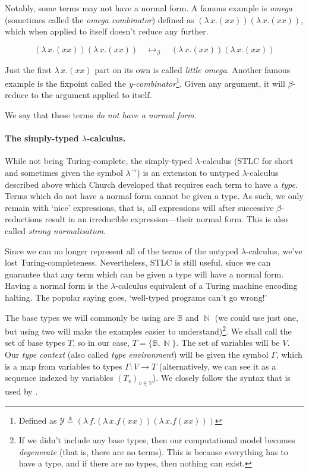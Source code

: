 \documentclass[logo,bsc,singlespacing,parskip,online]{infthesis}
\DeclareMathOperator{\nat}{\mathbb{N}}
\begin{document}
Notably, some terms may not have a normal form. A famous example is \textit{omega} (sometimes called the \textit{omega combinator}) defined as $(\lambda \, x. (x x)) (\lambda \, x. (x x))$, which when applied to itself doesn't reduce any further.

\begin{equation*}
  (\lambda \, x. (x x)) (\lambda \, x. (x x)) \quad \mapsto_{\beta} \quad (\lambda \, x. (x x)) (\lambda \, x. (x x))
\end{equation*}

Just the first $\lambda \, x. (x x)$ part on its own is called \textit{little omega}. Another famous example is the fixpoint called the \textit{y-combinator}\footnote{Defined as $\mathcal{Y} \triangleq (\lambda \, f. (\lambda \, x. f (x x )) (\lambda \, x. f (xx)))$}. Given any argument, it will $\beta$-reduce to the argument applied to itself.

We say that these terms \textit{do not have a normal form}.

\paragraph*{The simply-typed $\lambda$-calculus.} While not being Turing-complete, the simply-typed $\lambda$-calculus (STLC for short and sometimes given the symbol $\lambda^{\rightarrow}$) is an extension to untyped $\lambda$-calculus described above which Church developed that requires each term to have a \textit{type}. Terms which do not have a normal form cannot be given a type. As such, we only remain with `nice' expressions, that is, all expressions will after successive $\beta$-reductions result in an irreducible expression---their normal form. This is also called \textit{strong normalisation}. \citep{pierce_types_2002}

Since we can no longer represent all of the terms of the untyped $\lambda$-calculus, we've lost Turing-completeness. Nevertheless, STLC is still useful, since we can guarantee that any term which can be given a type will have a normal form. Having a normal form is the $\lambda$-calculus equivalent of a Turing machine encoding halting. The popular saying goes, `well-typed programs can't go wrong!' \citep{milner_theory_1978}

The base types we will commonly be using are $\mathbb{B}$ and $\nat$ (we could use just one, but using two will make the examples easier to understand)\footnote{If we didn't include any base types, then our computational model becomes \textit{degenerate} (that is, there are no terms). This is because everything has to have a type, and if there are no types, then nothing can exist.}. We shall call the set of base types $T$, so in our case, $T = \{ \mathbb{B} , \nat \}$. The set of variables will be $V$. Our \textit{type context} (also called \textit{type environment}) will be given the symbol $\Gamma$, which is a map from variables to types $\Gamma \colon V \to T$ (alternatively, we can see it as a sequence indexed by variables $(T_v)_{v \in V}$). We closely follow the syntax that is used by \citet{pierce_types_2002}.
\end{document}
